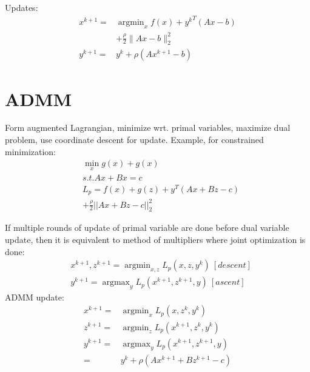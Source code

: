 \documentclass[8pt]{extarticle}
\DeclareMathOperator*{\argmin}{argmin}
\DeclareMathOperator*{\argmax}{argmax}
\newcommand{\norm}[1]{\|#1\|}
\begin{document}
\begin{multicols*}{2}
  Updates:
  \begin{align*}
    x^{k+1} = & \argmin_x f(x) + {y^{k}}^T(Ax-b)\\
                           & + \frac{\rho}{2}\norm{Ax-b}_2^2\\
    y^{k+1} = & y^k + \rho(Ax^{k+1}-b)
  \end{align*}

  \vfill\null
  \columnbreak
  
  \section{ADMM}

  Form augmented Lagrangian, minimize wrt. primal variables, maximize dual problem, use coordinate descent for update. Example, for constrained minimization:
  \begin{align*}
    & \min_x g(x) + g(x)\\
    & s.t. Ax + Bx = c\\
    & L_p = f(x) + g(z) + y^T(Ax+Bz-c)\\
    & + \frac{\rho}{2} ||Ax+Bz-c||_2^2
  \end{align*}
  
  If multiple rounds of update of primal variable are done before dual variable update, then it is equivalent to method of multipliers where joint optimization is done:
  \begin{align*}
    &x^{k+1}, z^{k+1} = \argmin_{x,z} L_p(x,z,y^k)\ [descent]\\
    &y^{k+1} = \argmax_{y} L_p(x^{k+1},z^{k+1},y)\ [ascent]
  \end{align*}
  ADMM update:
  \begin{align*}
    x^{k+1} = & \argmin_{x} L_p(x,z^k,y^k)\\
    z^{k+1} = & \argmin_{z} L_p(x^{k+1},z^k,y^k)\\
    y^{k+1} = & \argmax_{y} L_p(x^{k+1},z^{k+1},y)\\
              = & y^k + \rho(Ax^{k+1} + Bz^{k+1} -c)
  \end{align*}


\end{multicols*}
\end{document}
